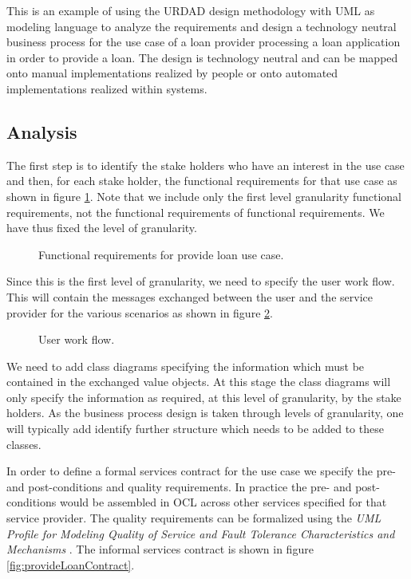 \documentclass{IOS-Book-Article}
\begin{document}
This is an example of using the URDAD design methodology with UML as modeling
language to analyze the requirements and design a technology neutral business
process for the use case of a loan provider processing a loan application in order
to provide a loan. The design is technology neutral and can be mapped onto manual
implementations realized by people or onto automated implementations realized
within systems.


\subsection{Analysis}

The first step is to identify the stake holders who have an interest in the use
case and then, for each stake holder, the functional requirements for that use case
as shown in figure \ref{fig:provideLoanFunctionalRequirements}. Note that we include
only the first level granularity functional requirements, not the functional requirements
of functional requirements. We have thus fixed the level of granularity.

\begin{figure}
  \centering
  \caption{Functional requirements for provide loan use case.}
  \label{fig:provideLoanFunctionalRequirements}
\end{figure}

Since this is the first level of granularity, we need to specify the user work
flow. This will contain the messages exchanged between the user and the
service provider for the various scenarios as shown in figure
\ref{fig:provideLoanUserWorkflow}.

\begin{figure}
  \centering
  \caption{User work flow.}
  \label{fig:provideLoanUserWorkflow}
\end{figure}

We need to add class diagrams specifying the information which must be
contained in the exchanged value objects. At this stage the class diagrams
will only specify the information as required, at this level of granularity,
 by the stake holders. As the
business process design is taken through levels of granularity, one will
typically add identify further structure which needs to be added to these classes.

In order to define a formal services contract for the use case we specify the
pre- and post-conditions and quality requirements. In practice the pre- and
post-conditions would be assembled in OCL across other services specified
for that service provider. The quality requirements can be formalized using the
{\em UML Profile for Modeling Quality of Service and Fault Tolerance Characteristics
and Mechanisms} \cite{omg:umlProfileQos}. The informal services contract is shown
in figure \ref{fig:provideLoanContract}.
\end{document}
